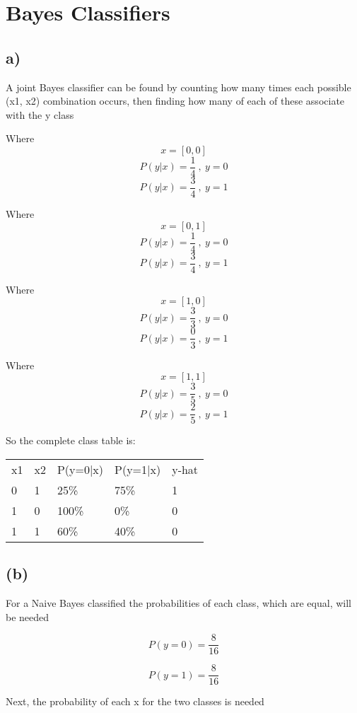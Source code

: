 \documentclass{article}
\begin{document}
\section{Bayes Classifiers}

\subsection{a)}

A joint Bayes classifier can be found by counting how many times each possible (x1, x2) combination occurs, then finding how many of each of these associate with the y class

Where $$ x = [0,0] $$
$$ P(y|x) = \frac{1}{4}\ ,\ y = 0 $$
$$ P(y|x) = \frac{3}{4}\ ,\ y = 1$$

Where $$x = [0,1]$$
$$ P(y|x) = \frac{1}{4}\ ,\  y = 0$$
$$ P(y|x) = \frac{3}{4}\ ,\ y = 1 $$

Where $$x = [1,0]$$
$$ P(y|x) = \frac{3}{3}\ ,\ y = 0 $$
$$ P(y|x) = \frac{0}{3}\ ,\ y = 1 $$

Where $$x = [1,1]$$
$$ P(y|x) = \frac{3}{5}\ ,\ y = 0 $$
$$ P(y|x) = \frac{2}{5}\ ,\ y = 1 $$


\begin{flushleft}
So the complete class table is:
\end{flushleft}{}


\begin{table}[h]
\centering
\begin{tabular}{lllll}
 x1  &  x2  &  P(y=0|x)  &  P(y=1|x)  &  y-hat \\
   0  &   1  &     25\%    &     75\%    &    1 \\
   1  &   0  &    100\%    &      0\%    &    0 \\
   1  &   1  &     60\%    &     40\%    &    0  
\end{tabular}
\end{table}

\subsection{(b)}

For a Naive Bayes classified the probabilities of each class, which are equal, will be needed

$$ P(y=0) = \frac{8}{16} $$

$$ P(y=1) = \frac{8}{16} $$

Next, the probability of each x for the two classes is needed
\end{document}
